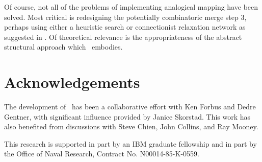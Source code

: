 Of course, not all of the problems of implementing analogical mapping have
been solved.  Most critical is redesigning the potentially combinatoric
merge step 3, perhaps using either a heuristic search or connectionist
relaxation network as suggested in \cite{sme-aij}. Of theoretical relevance
is the appropriateness of the abstract structural approach which \SME\
embodies.

\section{Acknowledgements}

The development of \SME\ has been a collaborative effort with Ken Forbus and
Dedre Gentner, with significant influence provided by Janice Skorstad. This
work has also benefited from discussions with Steve Chien, John Collins, and
Ray Mooney. 

This research is supported in part by an IBM graduate fellowship and in part
by the Office of Naval Research, Contract No. N00014-85-K-0559.

